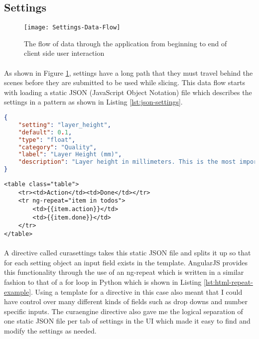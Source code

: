 \subsection{Settings}%
\begin{figure}[!ht]
  \centering
  \texttt{[image: Settings-Data-Flow]}
  \caption{The flow of data through the application from beginning to end of client side user interaction}
  \label{fig:settings-data-flow}
\end{figure}
\paragraph{}
As shown in Figure \ref{fig:settings-data-flow}, settings have a long path that they must travel behind the scenes before they are submitted to be used while slicing. 
This data flow starts with loading a static JSON (JavaScript Object Notation) file which describes the settings in a pattern as shown in Listing \ref{lst:json-settings}.
\begin{lstlisting}[language=json, style=thesiscode , label={lst:json-settings}, caption=A sample from a static settings file in JSON format.]
{
    "setting": "layer_height",
    "default": 0.1,
    "type": "float",
    "category": "Quality",
    "label": "Layer Height (mm)",
    "description": "Layer height in millimeters. This is the most important setting to determine the quality of your print. Normal quality prints are 0.1mm, high quality is 0.06mm. You can go up to 0.25mm."
}
\end{lstlisting}
\begin{lstlisting}[language=HTML5, style=thesiscode, label={lst:html-repeat-example}, caption=An example of a ng-repeat looping construct in HTML5.]
<table class="table">
	<tr><td>Action</td><td>Done</td></tr>
	<tr ng-repeat="item in todos">
		<td>{{item.action}}</td>
		<td>{{item.done}}</td>
	</tr>
</table>
\end{lstlisting}

\paragraph{}
A directive called curasettings takes this static JSON file and splits it up so that for each setting object an input field exists in the template.
AngularJS provides this functionality through the use of an ng-repeat which is written in a similar fashion to that of a for loop in Python which is shown in Listing \ref{lst:html-repeat-example}.
Using a template for a directive in this case also meant that I could have control over many different kinds of fields such as drop downs and number specific inputs.
The curaengine directive also gave me the logical separation of one static JSON file per tab of settings in the UI which made it easy to find and modify the settings as needed.

